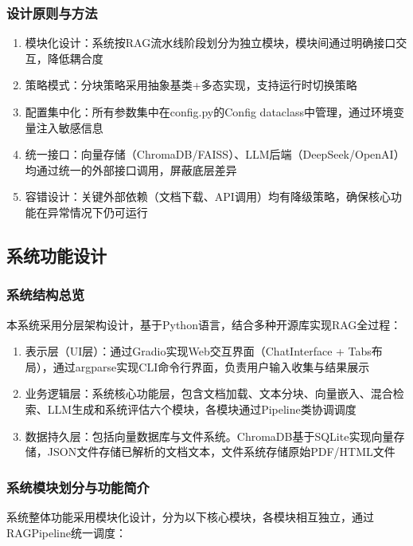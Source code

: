 \documentclass[10pt,a4paper]{article}
\begin{document}
\subsubsection{设计原则与方法}

\begin{enumerate}[label=(\arabic*)]
\item 模块化设计：系统按RAG流水线阶段划分为独立模块，模块间通过明确接口交互，降低耦合度
\item 策略模式：分块策略采用抽象基类+多态实现，支持运行时切换策略
\item 配置集中化：所有参数集中在config.py的Config dataclass中管理，通过环境变量注入敏感信息
\item 统一接口：向量存储（ChromaDB/FAISS）、LLM后端（DeepSeek/OpenAI）均通过统一的外部接口调用，屏蔽底层差异
\item 容错设计：关键外部依赖（文档下载、API调用）均有降级策略，确保核心功能在异常情况下仍可运行
\end{enumerate}

\subsection{系统功能设计}

\subsubsection{系统结构总览}

本系统采用分层架构设计，基于Python语言，结合多种开源库实现RAG全过程：

\begin{enumerate}[label=(\arabic*)]
\item 表示层（UI层）：通过Gradio实现Web交互界面（ChatInterface + Tabs布局），通过argparse实现CLI命令行界面，负责用户输入收集与结果展示
\item 业务逻辑层：系统核心功能层，包含文档加载、文本分块、向量嵌入、混合检索、LLM生成和系统评估六个模块，各模块通过Pipeline类协调调度
\item 数据持久层：包括向量数据库与文件系统。ChromaDB基于SQLite实现向量存储，JSON文件存储已解析的文档文本，文件系统存储原始PDF/HTML文件
\end{enumerate}

\subsubsection{系统模块划分与功能简介}

系统整体功能采用模块化设计，分为以下核心模块，各模块相互独立，通过RAGPipeline统一调度：
\end{document}

